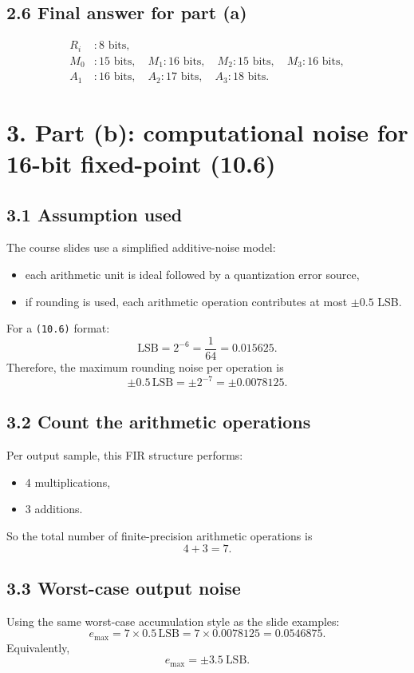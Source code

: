 \documentclass[11pt,a4paper]{article}
\begin{document}
\subsection*{2.6 Final answer for part (a)}
\[
\boxed{
\begin{aligned}
R_i &: 8\text{ bits},\\
M_0 &: 15\text{ bits},\quad M_1:16\text{ bits},\quad M_2:15\text{ bits},\quad M_3:16\text{ bits},\\
A_1 &: 16\text{ bits},\quad A_2:17\text{ bits},\quad A_3:18\text{ bits}.
\end{aligned}}
\]

\section*{3. Part (b): computational noise for 16-bit fixed-point (10.6)}
\subsection*{3.1 Assumption used}
The course slides use a simplified additive-noise model:
\begin{itemize}
  \item each arithmetic unit is ideal followed by a quantization error source,
  \item if rounding is used, each arithmetic operation contributes at most $\pm 0.5$ LSB.
\end{itemize}

For a \texttt{(10.6)} format:
\[
\text{LSB}=2^{-6}=\frac{1}{64}=0.015625.
\]
Therefore, the maximum rounding noise per operation is
\[
\pm 0.5\,\text{LSB}=\pm 2^{-7}=\pm 0.0078125.
\]

\subsection*{3.2 Count the arithmetic operations}
Per output sample, this FIR structure performs:
\begin{itemize}
  \item 4 multiplications,
  \item 3 additions.
\end{itemize}
So the total number of finite-precision arithmetic operations is
\[
4+3=7.
\]

\subsection*{3.3 Worst-case output noise}
Using the same worst-case accumulation style as the slide examples:
\[
e_{\max}=7\times 0.5\,\text{LSB}=7\times 0.0078125=0.0546875.
\]
Equivalently,
\[
e_{\max}=\pm 3.5\ \text{LSB}.
\]
\end{document}
